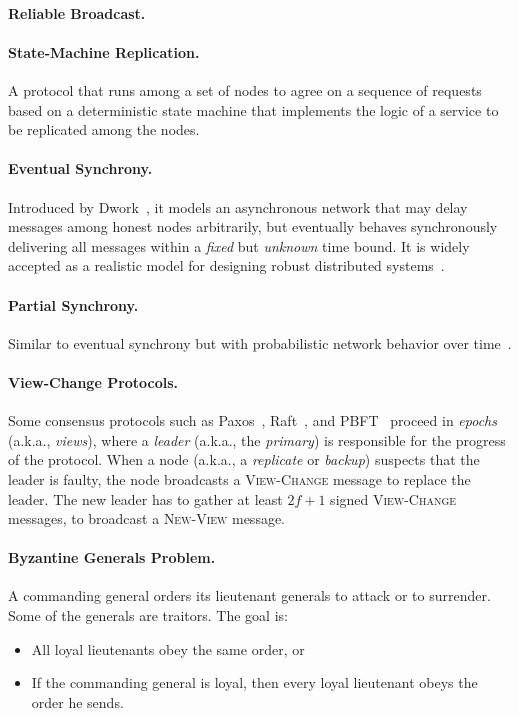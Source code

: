 \documentclass[11pt]{article}
\theoremstyle{mytheoremstyle}
\begin{document}
\paragraph{Reliable Broadcast.}

\paragraph{State-Machine Replication.}
A protocol that runs among a set of nodes to agree on a sequence of requests based on a deterministic state machine that implements the logic of a service to be replicated among the nodes.

\paragraph{Eventual Synchrony.} Introduced by Dwork~\cite{Dwork:1988:CPP}, it models an asynchronous network that may delay messages among honest nodes arbitrarily, but eventually behaves synchronously delivering all messages within a \emph{fixed} but \emph{unknown} time bound. It is widely accepted as a realistic model for designing robust distributed systems~\cite{DBLP:journals/corr/CachinV17}.

\paragraph{Partial Synchrony.} Similar to eventual synchrony but with probabilistic network behavior over time~\cite{Dwork:1988:CPP}.

\paragraph{View-Change Protocols.} Some consensus protocols such as Paxos~\cite{Lamport:1998:Paxos}, Raft~\cite{Raft:2014}, and PBFT~\cite{Castro:1999:PBFT} proceed in \emph{epochs} (a.k.a., \emph{views}), where a \emph{leader} (a.k.a., the \emph{primary}) is responsible for the progress of the protocol. When a node (a.k.a., a \emph{replicate} or \emph{backup}) suspects that the leader is faulty, the node broadcasts a \textsc{View-Change} message to replace the leader. The new leader has to gather at least $2f+1$ signed \textsc{View-Change} messages, to broadcast a \textsc{New-View} message.

\paragraph{Byzantine Generals Problem.} A commanding general orders its lieutenant generals to attack or to surrender. Some of the generals are traitors. The goal is:
\begin{itemize}
	\item All loyal lieutenants obey the same order, or
	\item If the commanding general is loyal, then every loyal lieutenant obeys the order he sends.
\end{itemize}
\end{document}
